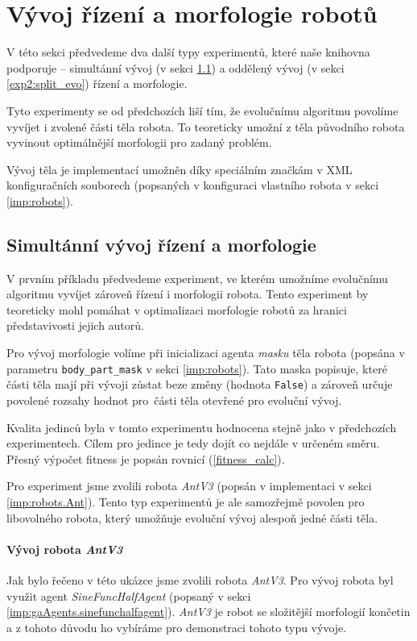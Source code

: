 \section{Vývoj řízení a morfologie robotů} \label{exp2}

V této sekci předvedeme dva další typy experimentů, které naše knihovna
podporuje -- simultánní vývoj (v sekci \ref{exp2:para_evo}) a oddělený
vývoj (v sekci \ref{exp2:split_evo}) řízení a morfologie.

Tyto experimenty se od předchozích liší tím, že evolučnímu algoritmu povolíme
vyvíjet i zvolené části těla robota. To teoreticky umožní z těla původního
robota vyvinout optimálnější morfologii pro zadaný problém.

Vývoj těla je implementací umožněn díky speciálním značkám v XML konfiguračních
souborech (popsaných v konfiguraci vlastního robota v sekci \ref{imp:robots}).

\subsection{Simultánní vývoj řízení a morfologie} \label{exp2:para_evo}

V prvním příkladu předvedeme experiment, ve kterém umožníme evolučnímu
algoritmu vyvíjet zároveň řízení i morfologii robota. Tento experiment by
teoreticky mohl pomáhat v optimalizaci morfologie robotů za hranici
představivosti jejich autorů. 

Pro vývoj morfologie volíme při inicializaci agenta \emph{masku} těla robota
(popsána v parametru \texttt{body\_part\_mask} v sekci \ref{imp:robots}). Tato
maska popisuje, které části těla mají při vývoji zůstat beze změny (hodnota
\texttt{False}) a zároveň určuje povolené rozsahy hodnot pro~části těla
otevřené pro evoluční vývoj.

Kvalita jedinců byla v tomto experimentu hodnocena stejně jako v předchozích
experimentech. Cílem pro jedince je tedy dojít co nejdále v určeném směru.
Přesný výpočet fitness je popsán rovnicí (\ref{fitness_calc}). 

Pro experiment jsme zvolili robota \emph{AntV3} (popsán v implementaci v sekci
\ref{imp:robots.Ant}). Tento typ experimentů je ale samozřejmě povolen pro
libovolného robota, který umožňuje evoluční vývoj alespoň jedné části těla.

\paragraph{Vývoj robota \emph{AntV3}}
Jak bylo řečeno v této ukázce jsme zvolili robota \emph{AntV3}. Pro vývoj
robota byl využit agent \emph{SineFuncHalfAgent} (popsaný v sekci
\ref{imp:gaAgents.sinefunchalfagent}). \emph{AntV3} je robot se složitější
morfologií končetin a z tohoto důvodu ho vybíráme pro demonstraci tohoto typu
vývoje.

